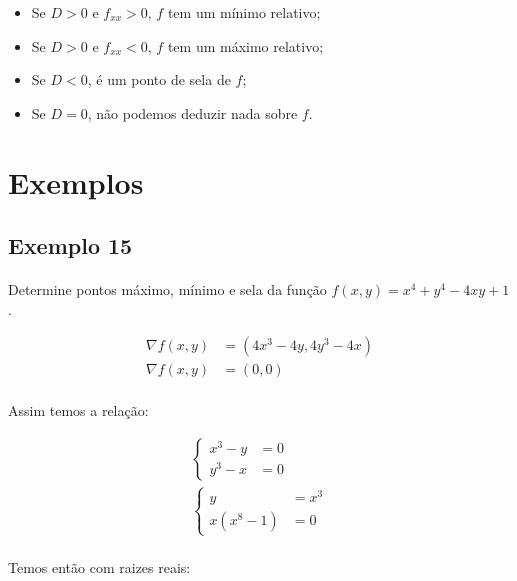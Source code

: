 \documentclass{article}
\begin{document}
            \begin{itemize}
                \item Se $D > 0$ e $f_{xx} > 0$, $f$ tem um mínimo relativo;
                \item Se $D > 0$ e $f_{xx} < 0$, $f$ tem um máximo relativo;
                \item Se $D < 0$, é um ponto de sela de $f$;
                \item Se $D = 0$, não podemos deduzir nada sobre $f$.
            \end{itemize}

    \section{Exemplos}
        \subsection{Exemplo 15}
            \paragraph{}
            Determine pontos máximo, mínimo e sela da função $f(x, y) = x^4 + y^4 - 4xy + 1$.

            \begin{align*}
                \nabla f(x, y) &= (4x^3 - 4y, 4y^3 - 4x)\\
                \nabla f(x, y) &= (0, 0)
            \end{align*}

            \paragraph{}
            Assim temos a relação:

            \begin{align*}
                \begin{cases}x^3 - y &= 0\\y^3 - x &= 0\end{cases}\\
                    \begin{cases}y &= x^3\\x (x^8 - 1) &= 0\end{cases}
            \end{align*}

            \paragraph{}
            Temos então com raizes reais:
\end{document}
